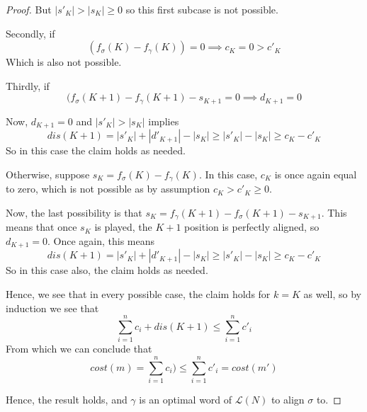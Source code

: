 \documentclass[conference]{IEEEtran}
\begin{document}
\begin{proof}
But $|s'_K| >|s_K| \geq 0 $ so this first subcase is not possible. 

Secondly, if $$(f_\sigma(K) - f_\gamma(K)) = 0 \implies c_K = 0 > c'_K$$ Which is also not possible. 

Thirdly, if $$(f_\sigma(K+1) - f_\gamma(K+1) - s_{K+1} = 0 \implies d_{K+1} = 0 $$

Now, $d_{K+1} = 0 $ and $|s'_K| > |s_K|$ implies $$dis(K+1) = |s'_K| + |d'_{K+1}| - |s_K| \geq |s'_K|  - |s_K| \geq c_K - c'_K$$ So in this case the claim holds as needed. 

Otherwise, suppose $s_K = f_\sigma(K) - f_\gamma(K)$. In this case, $c_K$ is once again equal to zero, which is not possible as by assumption $c_K > c'_K \geq 0$. 

Now, the last possibility is that $s_K = f_\gamma(K+1) - f_\sigma(K+1) -s_{K+1}$. This means that once $s_K$ is played, the $K+1$ position is perfectly aligned, so $d_{K+1} = 0$. Once again, this means $$dis(K+1) = |s'_K| + |d'_{K+1}| - |s_K| \geq |s'_K|  - |s_K| \geq c_K - c'_K$$ So in this case also, the claim holds as needed. 

Hence, we see that in every possible case, the claim holds for $k= K$ as well, so by induction we see that $$\sum_{i = 1}^{n} c_i + dis(K+1) \leq \sum_{i = 1}^{n} c'_i$$ From which we can conclude that $$cost(m) = \sum_{i = 1}^{n} c_i ) \leq \sum_{i = 1}^{n} c'_i = cost(m')$$

Hence, the result holds, and $\gamma$ is an optimal word of $\mathcal{L}(N)$ to align $\sigma$ to. 

\end{proof}
\end{document}
